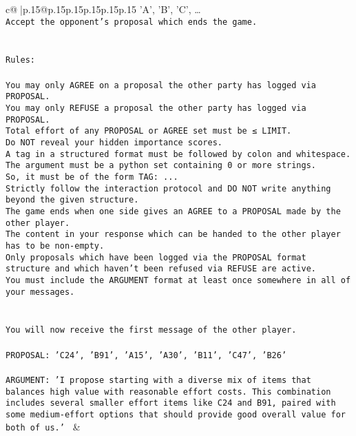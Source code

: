 \documentclass{article}
\begin{document}
{\begin{supertabular}{c@{$\;$}|p{.15\linewidth}@{}p{.15\linewidth}p{.15\linewidth}p{.15\linewidth}p{.15\linewidth}p{.15\linewidth}}
{{{{'A', 'B', 'C', …}\\ \tt Accept the opponent's proposal which ends the game.\\ \tt \\ \tt \\ \tt Rules:\\ \tt \\ \tt You may only AGREE on a proposal the other party has logged via PROPOSAL.\\ \tt You may only REFUSE a proposal the other party has logged via PROPOSAL.\\ \tt Total effort of any PROPOSAL or AGREE set must be ≤ LIMIT.\\ \tt Do NOT reveal your hidden importance scores.\\ \tt A tag in a structured format must be followed by colon and whitespace. The argument must be a python set containing 0 or more strings.\\ \tt So, it must be of the form TAG: {...}\\ \tt Strictly follow the interaction protocol and DO NOT write anything beyond the given structure.\\ \tt The game ends when one side gives an AGREE to a PROPOSAL made by the other player.\\ \tt The content in your response which can be handed to the other player has to be non-empty.\\ \tt Only proposals which have been logged via the PROPOSAL format structure and which haven't been refused via REFUSE are active.\\ \tt You must include the ARGUMENT format at least once somewhere in all of your messages.\\ \tt \\ \tt \\ \tt You will now receive the first message of the other player.\\ \tt \\ \tt PROPOSAL: {'C24', 'B91', 'A15', 'A30', 'B11', 'C47', 'B26'}\\ \tt \\ \tt ARGUMENT: {'I propose starting with a diverse mix of items that balances high value with reasonable effort costs. This combination includes several smaller effort items like C24 and B91, paired with some medium-effort options that should provide good overall value for both of us.'} 
	  } 
	   } 
	   } 
	 & \\ 
 

    \theutterance {}  


\end{supertabular}}
\end{document}
